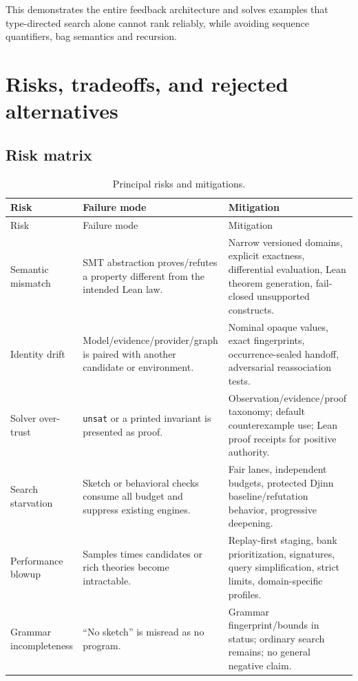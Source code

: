 \documentclass[11pt,oneside]{report}
\begin{document}
This demonstrates the entire feedback architecture and solves examples that type-directed search alone cannot rank reliably, while avoiding sequence quantifiers, bag semantics and recursion.

\chapter{Risks, tradeoffs, and rejected alternatives}
\label{chap:risks}

\section{Risk matrix}

\begin{longtable}{@{}L{0.20\textwidth}L{0.36\textwidth}L{0.35\textwidth}@{}}
\caption{Principal risks and mitigations.}\label{tab:risks}\\
\toprule
Risk & Failure mode & Mitigation \\
\midrule
\endfirsthead
\toprule
Risk & Failure mode & Mitigation \\
\midrule
\endhead
\bottomrule
\endfoot
Semantic mismatch & SMT abstraction proves/refutes a property different from the intended Lean law. & Narrow versioned domains, explicit exactness, differential evaluation, Lean theorem generation, fail-closed unsupported constructs. \\
Identity drift & Model/evidence/provider/graph is paired with another candidate or environment. & Nominal opaque values, exact fingerprints, occurrence-sealed handoff, adversarial reassociation tests. \\
Solver over-trust & \texttt{unsat} or a printed invariant is presented as proof. & Observation/evidence/proof taxonomy; default counterexample use; Lean proof receipts for positive authority. \\
Search starvation & Sketch or behavioral checks consume all budget and suppress existing engines. & Fair lanes, independent budgets, protected Djinn baseline/refutation behavior, progressive deepening. \\
Performance blowup & Samples times candidates or rich theories become intractable. & Replay-first staging, bank prioritization, signatures, query simplification, strict limits, domain-specific profiles. \\
Grammar incompleteness & ``No sketch'' is misread as no program. & Grammar fingerprint/bounds in status; ordinary search remains; no general negative claim. \\

\end{longtable}
\end{document}
